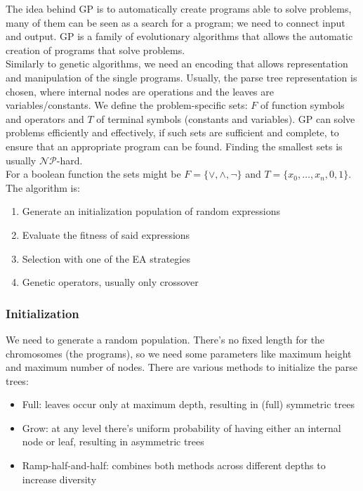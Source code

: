The idea behind GP is to automatically create programs able to solve problems, many of them can be seen as a search for a program; we need to connect input and output. GP is a family of evolutionary algorithms that allows the automatic creation of programs that solve problems.\\

Similarly to genetic algorithms, we need an encoding that allows representation and manipulation of the single programs. Usually, the parse tree representation is chosen, where internal nodes are operations and the leaves are variables/constants. We define the problem-specific sets: $F$ of function symbols and operators and $T$ of terminal symbols (constants and variables). GP can solve problems efficiently and effectively, if such sets are sufficient and complete, to ensure that an appropriate program can be found. Finding the smallest sets is usually $\mathcal{NP}$-hard.\\
For a boolean function the sets might be $F=\{\vee, \wedge, \neg\}$ and $T=\{x_0, \dots, x_n, 0, 1\}$.\\


The algorithm is:
\begin{enumerate}
	\item Generate an initialization population of random expressions
	\item Evaluate the fitness of said expressions
	\item Selection with one of the EA strategies
	\item Genetic operators, usually only crossover
\end{enumerate}

\subsubsection{Initialization}
We need to generate a random population. There's no fixed length for the chromosomes (the programs), so we need some parameters like maximum height and maximum number of nodes. There are various methods to initialize the parse trees:
\begin{itemize}
	\item Full: leaves occur only at maximum depth, resulting in (full) symmetric trees
	\item Grow: at any level there's uniform probability of having either an internal node or leaf, resulting in asymmetric trees
	\item Ramp-half-and-half: combines both methods across different depths to increase diversity
\end{itemize}

